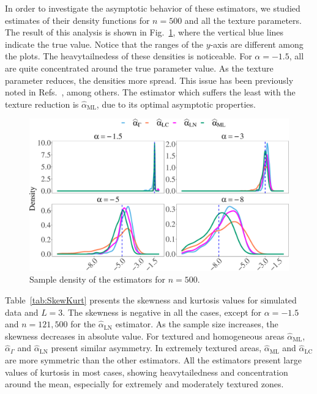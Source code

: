 \documentclass[twocolumn]{svjour3}
\begin{document}
In order to investigate the asymptotic behavior of these estimators, we studied estimates of their density functions for $n=500$ and all the texture parameters. 
The result of this analysis is shown in Fig.~\ref{Fig:Densities_n500}, where
the vertical blue lines indicate the true value. 
Notice that the ranges of the $y$-axis are different among the plots. 
The heavytailnedess of these densities is noticeable.
For $\alpha=-1.5$, all are quite concentrated around the true parameter value. 
As the texture parameter reduces, the densities more spread.
This issue has been previously noted in Refs.~\cite{APSAR2013ParameterEstimationStochasticDistances,CribariFrerySilva:CSDA,AllendeFreryetal:JSCS:05,FreryCribariSouza:JASP:04}, among others.
The estimator which suffers the least with the texture reduction is $\widehat{\alpha}_{\text{{ML}}}$, due to its optimal asymptotic properties.      

\begin{figure}[hbt]
\centering
\includegraphics[width=1\linewidth]{Asymptotic_n500_TodoAlfa}
\caption{\label{Fig:Densities_n500} Sample density of the estimators for $n=500$. }
\end{figure}

Table~\ref{tab:SkewKurt} presents the skewness and kurtosis values for simulated data and $L=3$. 
The skewness is negative in all the cases, except for $\alpha=-1.5$ and $n=121,500$ for the $\widehat{\alpha}_{\text{{LN}}}$ estimator. 
As the sample size increases, the skewness decreases in absolute value. 
For textured and homogeneous areas $\widehat{\alpha}_{\text{{ML}}}$, $\widehat{\alpha}_{\Gamma}$ and $\widehat{\alpha}_{\text{{LN}}}$ present similar asymmetry. 
In extremely textured areas, $\widehat{\alpha}_{\text{{ML}}}$ and $\widehat{\alpha}_{\text{{LC}}}$ are more symmetric than the other estimators.
All the estimators present large values of kurtosis in most cases, showing heavytailedness and concentration around the mean, especially for extremely and moderately textured zones.
\end{document}
